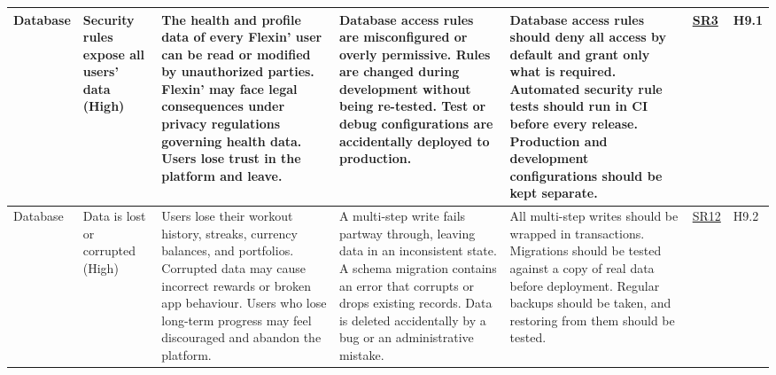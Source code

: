 \documentclass{article}
\begin{document}
\begin{landscape}
{\begin{longtable}{|p{2.5cm}|p{3cm}|p{3.8cm}|p{3.8cm}|p{5.5cm}|p{1.8cm}|p{1cm}|}
            Database & Security rules expose all users' data (High) & \textbullet{} The health and profile data of every Flexin' user can be read or modified by unauthorized parties. \newline \textbullet{} Flexin' may face legal consequences under privacy regulations governing health data. \newline \textbullet{} Users lose trust in the platform and leave. & \textbullet{} Database access rules are misconfigured or overly permissive. \newline \textbullet{} Rules are changed during development without being re-tested. \newline \textbullet{} Test or debug configurations are accidentally deployed to production. & \textbullet{} Database access rules should deny all access by default and grant only what is required. \newline \textbullet{} Automated security rule tests should run in CI before every release. \newline \textbullet{} Production and development configurations should be kept separate. & \hyperlink{sr3}{SR3} & H9.1 \\
            \hline
            Database & Data is lost or corrupted (High) & \textbullet{} Users lose their workout history, streaks, currency balances, and portfolios. \newline \textbullet{} Corrupted data may cause incorrect rewards or broken app behaviour. \newline \textbullet{} Users who lose long-term progress may feel discouraged and abandon the platform. & \textbullet{} A multi-step write fails partway through, leaving data in an inconsistent state. \newline \textbullet{} A schema migration contains an error that corrupts or drops existing records. \newline \textbullet{} Data is deleted accidentally by a bug or an administrative mistake. & \textbullet{} All multi-step writes should be wrapped in transactions. \newline \textbullet{} Migrations should be tested against a copy of real data before deployment. \newline \textbullet{} Regular backups should be taken, and restoring from them should be tested. & \hyperlink{sr12}{SR12} & H9.2 \\
            \hline

\end{longtable}}
\end{landscape}
\end{document}
